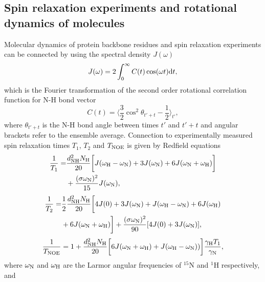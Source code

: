 \documentclass[pre,aps,floatfix,authordate1-4,twocolumn]{revtex4-1}
\begin{document}
\subsection{Spin relaxation experiments and rotational dynamics of molecules}
Molecular dynamics of protein backbone residues and spin relaxation experiments can
be connected by using the spectral density $J(\omega)$ 
\begin{equation}\label{SPECTdens}
  J(\omega)=2\int_0^\infty C(t) \cos(\omega t) {\rm d}t,
\end{equation}
which is the Fourier transformation of the second order
rotational correlation function for N-H bond vector
\begin{equation}\label{CORRFdef}
  C(t)=\langle \frac{3}{2}\cos^2\theta_{t'+t}-\frac{1}{2} \rangle_{t'},
\end{equation}
where $\theta_{t'+t}$ is the N-H bond angle between times $t'$ and $t'+t$
and angular brackets refer to the ensemble average.
Connection to experimentally measured spin relaxation times $T_1$, $T_2$
and $T_{\rm NOE}$ is given by Redfield equations \cite{abragam,kay89}
\begin{equation}\label{R1}
  \begin{aligned}
  \frac{1}{T_1}= & \frac{d_{\rm{NH}}^2N_{\rm{H}}}{20}\bigg[J(\omega_{\rm{H}}-\omega_{\rm{N}})+3J(\omega_{\rm{N}})+6J(\omega_{\rm{N}}+\omega_{\rm{H}})\bigg] \\
        & +\frac{(\sigma \omega_{\rm{N}})^2}{15}J(\omega_{\rm{N}}),
  \end{aligned}
\end{equation}
\begin{equation}\label{R2}
    \begin{aligned}
  \frac{1}{T_2}= & \frac{1}{2}\frac{d_{\rm{NH}}^2N_{\rm{H}}}{20}\bigg[4J(0)+3J(\omega_{\rm{N}})+J(\omega_{\rm{H}}-\omega_{\rm{N}})+6J(\omega_{\rm{H}})  \\
    & +6J(\omega_{\rm{N}}+\omega_{\rm{H}})\bigg]+\frac{(\sigma \omega_{\rm{N}})^2}{90}[4J(0) +3J(\omega_{\rm{N}})],
    \end{aligned}
\end{equation}
\begin{equation}\label{NOE}
  \frac{1}{T_{\rm NOE}}=1+\frac{d_{\rm{NH}}^2N_{\rm{H}}}{20}\bigg[6J(\omega_{\rm{N}}+\omega_{\rm{H}})+J(\omega_{\rm{H}}-\omega_{\rm{N}}))\bigg]\frac{\gamma_{\rm{H}}T_1}{\gamma_{\rm{N}}},
\end{equation}
where $\omega_{\rm{N}}$ and $\omega_{\rm{H}}$ are the Larmor angular
frequencies of $^{15}$N and $^1$H respectively, and
\end{document}
